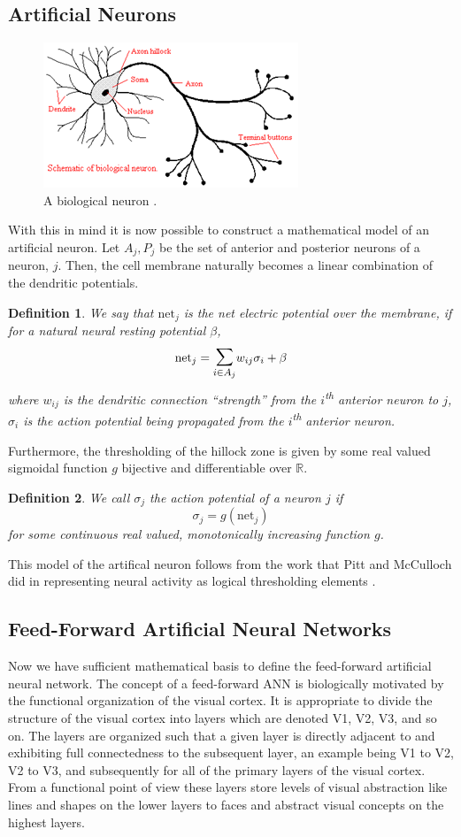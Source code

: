 \documentclass{ib-assignment}
\newtheorem{definition}{Definition}[section]
\newcommand{\Sum}{\mathlarger{\mathlarger{\sum}}}
\begin{document}
\subsection{Artificial Neurons}
\begin{figure}
\centering
\includegraphics{neuron}
\caption{A biological neuron \cite{neuralimage}.}
\end{figure}
	With this in mind it is now possible to construct a mathematical model of an artificial neuron. Let \( A_j, P_j\) be the set of anterior and posterior neurons of a neuron, \(j\). Then, the cell membrane naturally becomes a linear combination of the dendritic potentials.
   \begin{definition}
   We say that \(\mathrm{net}_j\) is the net electric potential over the membrane, if for a natural neural resting potential \(\beta\), 
\[ \textrm{net}_j = \Sum_{i \in A_j}{w_{ij}\sigma_i} + \beta \]where \(w_{ij}\) is the dendritic connection “strength” from the \(i\)\textsuperscript{th} anterior neuron to \(j\), \(\sigma_i\) is the action potential being propagated from the \(i\)\textsuperscript{th} anterior neuron. 
   \end{definition}
   
Furthermore, the thresholding of the hillock zone is given by some real valued sigmoidal function \(g\) bijective and differentiable over \(\mathbb{R}\). 
\begin{definition}
We call \(\sigma_j\) the action potential  of a neuron \(j\) if  
\[\sigma_j = g\left(\mathrm{net}_j\right)\]
for some continuous real valued, monotonically increasing function \(g\).
\end{definition}
This model of the artifical neuron follows from the work that Pitt and McCulloch did in representing neural activity as logical thresholding elements  \cite{mcculloch}.

\subsection{Feed-Forward Artificial Neural Networks}
	Now we have sufficient mathematical basis to define the feed-forward artificial neural network. The concept of a feed-forward ANN is biologically motivated by the functional organization of the visual cortex. It is appropriate to divide the structure of the visual cortex into layers which are denoted V1, V2, V3, and so on. The layers are organized such that a given layer is directly adjacent to and exhibiting full connectedness to the subsequent layer, an example being V1 to V2, V2 to V3, and subsequently for all of the primary layers of the visual cortex. From a functional point of view these layers store levels of visual abstraction like lines and shapes on the lower layers to faces and abstract visual concepts on the highest layers\cite{visualcortex}.
\end{document}
